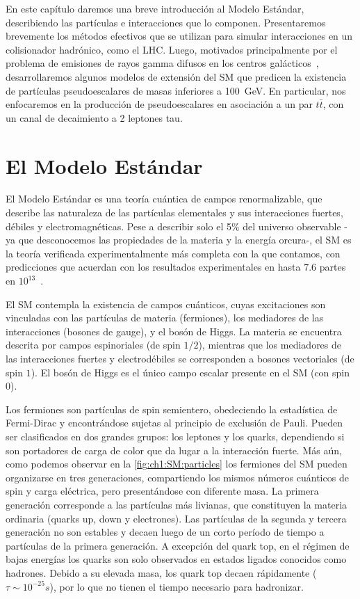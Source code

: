En este capítulo daremos una breve introducción al Modelo Estándar, describiendo las partículas e interacciones que lo componen. Presentaremos brevemente los métodos efectivos que se utilizan para simular interacciones en un colisionador hadrónico, como el LHC. Luego, motivados principalmente por el problema de emisiones de rayos gamma difusos en los centros galácticos~\cite{Hooper2011}, desarrollaremos algunos modelos de extensión del SM que predicen la existencia de partículas pseudoescalares de masas inferiores a \SI{100}{\GeV}. En particular, nos enfocaremos en la producción de pseudoescalares en asociación a un par $t\bar{t}$, con un canal de decaimiento a 2 leptones tau.




\section{El Modelo Estándar}

El Modelo Estándar es una teoría cuántica de campos renormalizable, que describe las naturaleza de las partículas elementales y sus interacciones fuertes, débiles y electromagnéticas. Pese a describir solo el 5\% del universo observable -ya que desconocemos las propiedades de la materia y la energía orcura-, el SM es la teoría verificada experimentalmente más completa con la que contamos, con predicciones que acuerdan con los resultados experimentales en hasta 7.6 partes en $10^{13}$~\cite{Hanneke2008}.

El SM contempla la existencia de campos cuánticos, cuyas excitaciones son vinculadas con las partículas de materia (fermiones), los mediadores de las interacciones (bosones de gauge), y el bosón de Higgs. La materia se encuentra descrita por campos espinoriales (de spin $1/2$), mientras que los mediadores de las interacciones fuertes y electrodébiles se corresponden a bosones vectoriales (de spin $1$). El bosón de Higgs es el único campo escalar presente en el SM (con spin $0$).

Los fermiones son partículas de spin semientero, obedeciendo la estadística de Fermi-Dirac y encontrándose sujetas al principio de exclusión de Pauli. Pueden ser clasificados en dos grandes grupos: los leptones y los quarks, dependiendo si son portadores de carga de color que da lugar a la interacción fuerte. Más aún, como podemos observar en la \cref{fig:ch1:SM:particles} los fermiones del SM pueden organizarse en tres generaciones, compartiendo los mismos números cuánticos de spin y carga eléctrica, pero presentándose con diferente masa. La primera generación corresponde a las partículas más livianas, que constituyen la materia ordinaria (quarks up, down y electrones). Las partículas de la segunda y tercera generación no son estables y decaen luego de un corto período de tiempo a partículas de la primera generación. A excepción del quark top, en el régimen de bajas energías los quarks son solo observados en estados ligados conocidos como hadrones. Debido a su elevada masa, los quark top decaen rápidamente ($\tau \sim 10^{-25}\si{s}$), por lo que no tienen el tiempo necesario para hadronizar.

